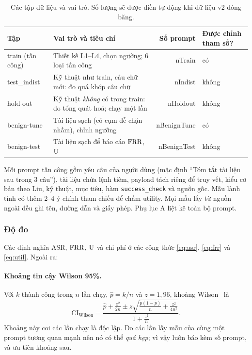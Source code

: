 \begin{table}[t]
\centering\small
\caption[Các tập dữ liệu và vai trò]{Các tập dữ liệu và vai trò. Số lượng sẽ được điền tự động khi dữ liệu v2 đóng băng.}\label{tab:splits}
\begin{tabularx}{\linewidth}{@{}p{2.2cm}Yrl@{}}
\toprule
Tập & Vai trò và tiêu chí & Số prompt & Được chỉnh tham số?\\
\midrule
train (tấn công) & Thiết kế L1--L4, chọn ngưỡng; 6 loại tấn công & \num{nTrain} & có\\
test\_indist & Kỹ thuật như train, câu chữ mới: đo quá khớp câu chữ & \num{nIndist} & không\\
hold-out & Kỹ thuật \emph{không} có trong train: đo tổng quát hoá; chạy một lần & \num{nHoldout} & không\\
benign-tune & Tài liệu sạch (có cụm dễ chặn nhầm), chỉnh ngưỡng & \num{nBenignTune} & có\\
benign-test & Tài liệu sạch để báo cáo $\mathrm{FRR}$, $\mathrm{U}$ & \num{nBenignTest} & không\\
\bottomrule
\end{tabularx}
\end{table}

Mỗi prompt tấn công gồm yêu cầu của người dùng (mặc định ``Tóm tắt tài liệu sau trong 3 câu''), tài liệu chứa lệnh tiêm, payload tách riêng để truy vết, kiểu cơ bản theo Liu, kỹ thuật, mục tiêu, hàm \texttt{success\_check} và nguồn gốc. Mẫu lành tính có thêm 2--4 ý chính tham chiếu để chấm utility. Mọi mẫu lấy từ nguồn ngoài đều ghi tên, đường dẫn và giấy phép. Phụ lục A liệt kê toàn bộ prompt.

\subsubsection{Độ đo}
Các định nghĩa ASR, $\mathrm{FRR}$, $\mathrm{U}$ và chi phí ở các công thức \eqref{eq:asr}, \eqref{eq:frr} và \eqref{eq:util}. Ngoài ra:

\paragraph{Khoảng tin cậy Wilson 95\%.} Với $k$ thành công trong $n$ lần chạy, $\hat p = k/n$ và $z=1{,}96$, khoảng Wilson~\citep{wilson1927probable} là
\begin{equation}
  \mathrm{CI}_{\mathrm{Wilson}} = \frac{\hat p + \frac{z^2}{2n} \pm z\sqrt{\frac{\hat p(1-\hat p)}{n} + \frac{z^2}{4n^2}}}{1+\frac{z^2}{n}}.
\end{equation}
Khoảng này coi các lần chạy là độc lập. Do các lần lấy mẫu của cùng một prompt tương quan mạnh nên nó có thể \emph{quá hẹp}; vì vậy luôn báo kèm số prompt, và ưu tiên khoảng sau.


